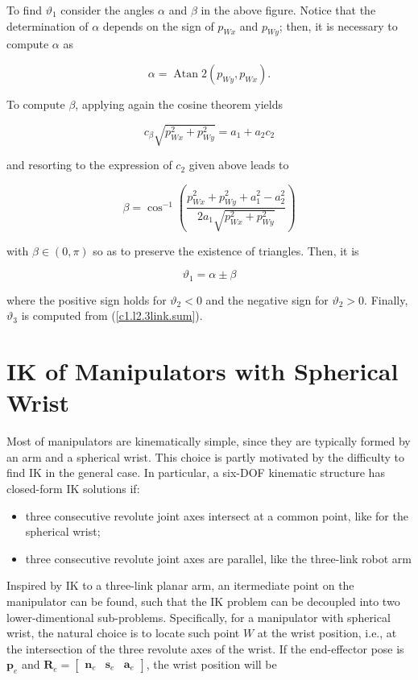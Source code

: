 \documentclass[10pt]{article}
\begin{document}
\noindent



\noindent
To find $\vartheta_{1}$ consider the angles $\alpha$ and $\beta$ in the above figure. Notice that the determination of $\alpha$ depends on the sign of $p_{W x}$ and $p_{W y}$; then, it is necessary to compute $\alpha$ as

$$
\alpha=\operatorname{Atan} 2\left(p_{W y}, p_{W x}\right) .
$$

\noindent
To compute $\beta$, applying again the cosine theorem yields

$$
c_{\beta} \sqrt{p_{W x}^{2}+p_{W y}^{2}}=a_{1}+a_{2} c_{2}
$$

\noindent
and resorting to the expression of $c_{2}$ given above leads to

$$
\beta=\cos ^{-1}\left(\frac{p_{W x}^{2}+p_{W y}^{2}+a_{1}^{2}-a_{2}^{2}}{2 a_{1} \sqrt{p_{W x}^{2}+p_{W y}^{2}}}\right)
$$

\noindent
with $\beta \in(0, \pi)$ so as to preserve the existence of triangles. Then, it is

$$
\vartheta_{1}=\alpha \pm \beta
$$

\noindent
where the positive sign holds for $\vartheta_{2}<0$ and the negative sign for $\vartheta_{2}>0$. Finally, $\vartheta_{3}$ is computed from (\ref{c1.l2.3link.sum}).





\section{IK of Manipulators with Spherical Wrist}
Most of manipulators are kinematically simple, since they are typically formed by an arm and a spherical wrist. This choice is partly motivated by the difficulty to find IK in the general case. In particular, a six-DOF kinematic structure has closed-form IK solutions if:

\begin{itemize}
  \item three consecutive revolute joint axes intersect at a common point, like for the spherical wrist;
  \item three consecutive revolute joint axes are parallel, like the three-link robot arm
\end{itemize}

\noindent
Inspired by  IK to a three-link planar arm, an itermediate point on the  manipulator  can be found, such that the IK problem can be decoupled into two lower-dimentional sub-problems. 
Specifically, for a manipulator with spherical wrist, the natural choice is to locate such point $W$ at the wrist position, i.e., at the intersection of the three  revolute axes of the wrist. If the end-effector pose is $\boldsymbol{p}_{e}$ and $\boldsymbol{R}_{e}=\left[\begin{array}{lll}\boldsymbol{n}_{e} & \boldsymbol{s}_{e} & \boldsymbol{a}_{e}\end{array}\right]$, the wrist position will be
\end{document}
